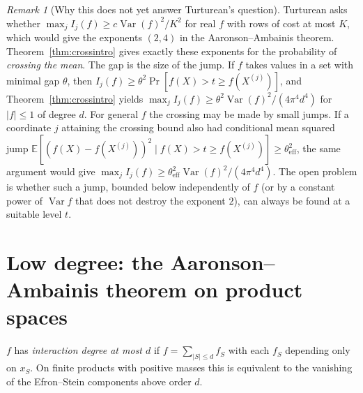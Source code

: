 \documentclass[11pt]{article}
\numberwithin{equation}{section}
\theoremstyle{definition}
\theoremstyle{remark}
\newtheorem{remark}[theorem]{Remark}
\newcommand{\E}{\mathbb{E}}
\newcommand{\1}{\mathbf 1}
\newcommand{\Var}{\operatorname{Var}}
\begin{document}
\begin{remark}[Why this does not yet answer Turturean's question]\label{rem:crossing}
Turturean asks~\cite[Section~9.5]{Tur26} whether $\max_jI_j(f)\ge c\Var(f)^2/K^2$ for real $f$ with rows of cost at most $K$, which would give the exponents $(2,4)$ in the Aaronson--Ambainis theorem. Theorem~\ref{thm:crossintro} gives exactly these exponents for the probability of \emph{crossing the mean}. The gap is the size of the jump. If $f$ takes values in a set with minimal gap $\theta$, then $I_j(f)\ge\theta^2\Pr[f(X)>t\ge f(X^{(j)})]$, and Theorem~\ref{thm:crossintro} yields $\max_jI_j(f)\ge\theta^2\Var(f)^2/(4\pi^4d^4)$ for $|f|\le1$ of degree $d$. For general $f$ the crossing may be made by small jumps. If a coordinate $j$ attaining the crossing bound also had conditional mean squared jump $\E[(f(X)-f(X^{(j)}))^2\mid f(X)>t\ge f(X^{(j)})]\ge\theta_{\mathrm{eff}}^2$, the same argument would give $\max_jI_j(f)\ge\theta_{\mathrm{eff}}^2\Var(f)^2/(4\pi^4d^4)$. The open problem is whether such a jump, bounded below independently of $f$ (or by a constant power of $\Var f$ that does not destroy the exponent $2$), can always be found at a suitable level $t$.
\end{remark}

\section{Low degree: the Aaronson--Ambainis theorem on product spaces}

$f$ has \emph{interaction degree at most $d$} if $f=\sum_{|S|\le d}f_S$ with each $f_S$ depending only on $x_S$. On finite products with positive masses this is equivalent to the vanishing of the Efron--Stein components above order $d$.
\end{document}
